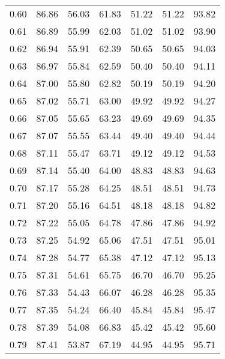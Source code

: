 \begin{tabular}{|c|c|c|c|c|c|c|}
      0.60 &     86.86 &     56.03 &      61.83 &   51.22 &      51.22 &         93.82 \\
      0.61 &     86.89 &     55.99 &      62.03 &   51.02 &      51.02 &         93.90 \\
      0.62 &     86.94 &     55.91 &      62.39 &   50.65 &      50.65 &         94.03 \\
      0.63 &     86.97 &     55.84 &      62.59 &   50.40 &      50.40 &         94.11 \\
      0.64 &     87.00 &     55.80 &      62.82 &   50.19 &      50.19 &         94.20 \\
      0.65 &     87.02 &     55.71 &      63.00 &   49.92 &      49.92 &         94.27 \\
      0.66 &     87.05 &     55.65 &      63.23 &   49.69 &      49.69 &         94.35 \\
      0.67 &     87.07 &     55.55 &      63.44 &   49.40 &      49.40 &         94.44 \\
      0.68 &     87.11 &     55.47 &      63.71 &   49.12 &      49.12 &         94.53 \\
      0.69 &     87.14 &     55.40 &      64.00 &   48.83 &      48.83 &         94.63 \\
      0.70 &     87.17 &     55.28 &      64.25 &   48.51 &      48.51 &         94.73 \\
      0.71 &     87.20 &     55.16 &      64.51 &   48.18 &      48.18 &         94.82 \\
      0.72 &     87.22 &     55.05 &      64.78 &   47.86 &      47.86 &         94.92 \\
      0.73 &     87.25 &     54.92 &      65.06 &   47.51 &      47.51 &         95.01 \\
      0.74 &     87.28 &     54.77 &      65.38 &   47.12 &      47.12 &         95.13 \\
      0.75 &     87.31 &     54.61 &      65.75 &   46.70 &      46.70 &         95.25 \\
      0.76 &     87.33 &     54.43 &      66.07 &   46.28 &      46.28 &         95.35 \\
      0.77 &     87.35 &     54.24 &      66.40 &   45.84 &      45.84 &         95.47 \\
      0.78 &     87.39 &     54.08 &      66.83 &   45.42 &      45.42 &         95.60 \\
      0.79 &     87.41 &     53.87 &      67.19 &   44.95 &      44.95 &         95.71 \\

\end{tabular}
